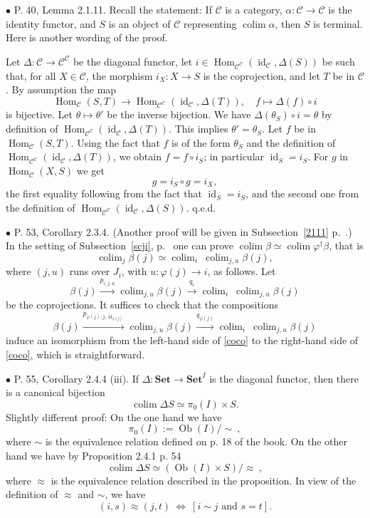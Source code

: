 \documentclass[12pt]{article}
\theoremstyle{remark}%
\newcommand{\bu}{\bullet}
\newcommand{\n}{\noindent}
\newcommand{\C}{\mathcal C}
\newcommand{\Set}{\textbf{Set}}
\newcommand{\p}{\varphi}
\newcommand{\be}{\begin{equation}}
\newcommand{\ee}{\end{equation}}
\DeclareMathOperator*{\coli}{colim}
\DeclareMathOperator*{\co}{colim}
\DeclareMathOperator{\id}{id}
\DeclareMathOperator{\h}{Hom}
\DeclareMathOperator{\Ob}{Ob}
\begin{document}

\n$\bu$ P. 40, Lemma 2.1.11. Recall the statement: If $\C$ is a category, $\alpha:\C\to\C$ is the identity functor, and $S$ is an object of $\C$ representing $\coli\alpha$, then $S$ is terminal. Here is another wording of the proof. 

Let $\Delta:\C\to\C^\C$ be the diagonal functor, let $i\in\h_{\C^\C}(\id_\C,\Delta(S))$ be such that, for all $X\in\C$, the morphism $i_X:X\to S$ is the coprojection, and let $T$ be in $\C$. By assumption the map 
$$
\h_\C(S,T)\to\h_{\C^\C}(\id_\C,\Delta(T)),\quad f\mapsto\Delta(f)\circ i 
$$ 
is bijective. Let $\theta\mapsto\theta'$ be the inverse bijection. We have $\Delta(\theta_S)\circ i=\theta$ by definition of $\h_{\C^\C}(\id_\C,\Delta(T))$. This implies $\theta'=\theta_S$. Let $f$ be in $\h_\C(S,T)$. Using the fact that $f$ is of the form $\theta_S$ and the definition of $\h_{\C^\C}(\id_\C,\Delta(T))$, we obtain $f=f\circ i_S$; in particular $\id_S=i_S$. For $g$ in $\h_\C(X,S)$ we get 
$$
g=i_S\circ g=i_X,
$$
the first equality following from the fact that $\id_S=i_S$, and the second one from the definition of $\h_{\C^\C}(\id_\C,\Delta(S))$. q.e.d. 


\n$\bu$ P. 53, Corollary 2.3.4. (Another proof will be given in Subsection~\ref{2111} p.~\pageref{2111}.) In the setting of Subsection~\ref{scji}, p.~\pageref{scji} one can prove $\co\beta\simeq\co\p^\dagger\beta$, that is 
%
\be\label{coco} 
\co_j\beta(j)\simeq\co_i\ \co_{j,u}\beta(j),  
\ee 
% 
where $(j,u)$ runs over $J_i$, with $u:\p(j)\to i$, as follows. Let 
$$ 
\beta(j)\xrightarrow{p_{i,j,u}}\co_{j,u}\beta(j)\xrightarrow{q_i}\co_i\ \co_{j,u}\beta(j)
$$ 
be the coprojections. It suffices to check that the compositions 
$$
\beta(j)\xrightarrow{p_{\p(j),j,\id_{\p(j)}}}\co_{j,u}\beta(j)\xrightarrow{q_{\p(j)}}\co_i\ \co_{j,u}\beta(j)
$$ 
induce an isomorphism from the left-hand side of \eqref{coco} to the right-hand side of \eqref{coco}, which is straightforward. 


\n$\bu$ P. 55, Corollary 2.4.4 (iii). If $\Delta:\Set\to\Set^I$ is the diagonal functor, then there is a canonical bijection
$$
\coli\Delta S\simeq\pi_0(I)\times S.
$$
Slightly different proof: On the one hand we have 
$$
\pi_0(I):=\Ob(I)/\!\!\sim\ , 
$$
where $\sim$ is the equivalence relation defined on p. 18 of the book. On the other hand  we have by Proposition 2.4.1 p. 54
$$
\coli\Delta S\simeq(\Ob(I)\times S)/\!\!\approx\ ,
$$
where $\approx$ is the equivalence relation described in the proposition. In view of the definition of $\approx$ and $\sim$, we have 
$$
(i,s)\approx(j,t)\ \iff\ [i\sim j\text{ and }s=t].
$$  
\end{document}
